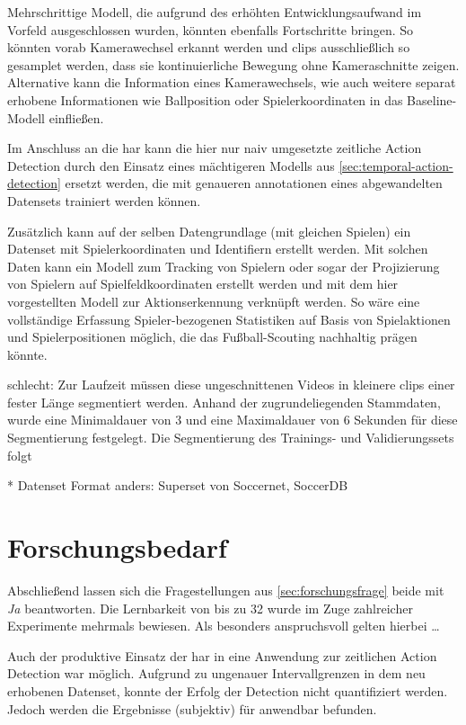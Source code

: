 Mehrschrittige Modell, die aufgrund des erhöhten Entwicklungsaufwand im Vorfeld ausgeschlossen wurden, könnten ebenfalls Fortschritte bringen.
So könnten \zB vorab Kamerawechsel erkannt werden und \glspl{clip} ausschließlich so gesamplet werden, dass sie kontinuierliche Bewegung ohne Kameraschnitte zeigen.
Alternative kann die Information eines Kamerawechsels, wie auch weitere separat erhobene Informationen wie Ballposition oder Spielerkoordinaten in das Baseline-Modell einfließen.

Im Anschluss an die \gls{har} kann die hier nur naiv umgesetzte zeitliche Action Detection durch den Einsatz eines mächtigeren Modells aus \autoref{sec:temporal-action-detection} ersetzt werden, die mit genaueren \gls{annotationen} eines abgewandelten Datensets trainiert werden können.

Zusätzlich kann auf der selben Datengrundlage (mit gleichen Spielen) ein Datenset mit Spielerkoordinaten und Identifiern erstellt werden.
Mit solchen Daten kann \ggf ein Modell zum Tracking von Spielern oder sogar der Projizierung von Spielern auf Spielfeldkoordinaten erstellt werden und mit dem hier vorgestellten Modell zur Aktionserkennung verknüpft werden.
So wäre eine vollständige Erfassung Spieler-bezogenen Statistiken auf Basis von Spielaktionen und Spielerpositionen möglich, die das Fußball-Scouting nachhaltig prägen könnte.

schlecht:
Zur Laufzeit müssen diese ungeschnittenen Videos in kleinere \glspl{clip} einer fester Länge segmentiert werden.
Anhand der zugrundeliegenden Stammdaten, wurde eine Minimaldauer von 3 und eine Maximaldauer von 6 Sekunden für diese Segmentierung festgelegt.
Die Segmentierung des Trainings- und Validierungssets folgt

* Datenset Format anders: Superset von Soccernet, SoccerDB

\section{Forschungsbedarf}
\label{sec:fazit}

Abschließend lassen sich die Fragestellungen aus \autoref{sec:forschungsfrage} beide mit \emph{Ja} beantworten.
Die Lernbarkeit von bis zu 32 wurde im Zuge zahlreicher Experimente mehrmals bewiesen.
Als besonders anspruchsvoll gelten hierbei \dots


Auch der produktive Einsatz der \gls{har} in eine Anwendung zur zeitlichen Action Detection war möglich.
Aufgrund zu ungenauer Intervallgrenzen in dem neu erhobenen Datenset, konnte der Erfolg der Detection nicht quantifiziert werden.
Jedoch werden die Ergebnisse (subjektiv) für anwendbar befunden.
